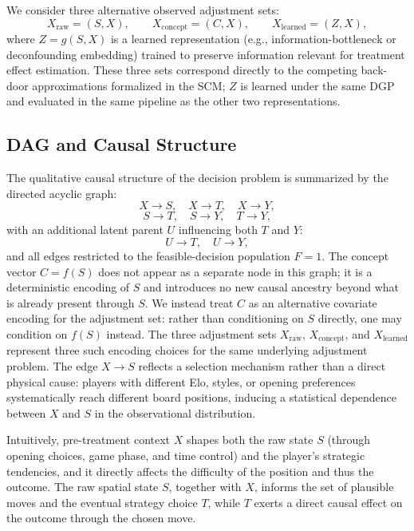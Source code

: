 \documentclass[11pt]{article}
\begin{document}
We consider three alternative observed adjustment sets:
\[
X_{\text{raw}} = (S, X), \qquad
X_{\text{concept}} = (C, X), \qquad
X_{\text{learned}} = (Z, X),
\]
where \(Z = g(S, X)\) is a learned representation (e.g., information-bottleneck or
deconfounding embedding) trained to preserve information relevant for treatment
effect estimation.\cite{kuang2020information,deconfoundingScores} These three sets
correspond directly to the competing back-door approximations formalized in the SCM;
$Z$ is learned under the same DGP and evaluated in the same pipeline as the other
two representations.

\subsection*{DAG and Causal Structure}

The qualitative causal structure of the decision problem is summarized by the
directed acyclic graph:
\[
X \rightarrow S, \quad X \rightarrow T, \quad X \rightarrow Y,
\]
\[
S \rightarrow T, \quad S \rightarrow Y, \quad T \rightarrow Y,
\]
with an additional latent parent \(U\) influencing both \(T\) and \(Y\):
\[
U \rightarrow T, \quad U \rightarrow Y,
\]
and all edges restricted to the feasible-decision population \(F=1\). The concept
vector \(C = f(S)\) does not appear as a separate node in this graph; it is a
deterministic encoding of \(S\) and introduces no new causal ancestry beyond what
is already present through \(S\). We instead treat \(C\) as an alternative covariate
encoding for the adjustment set: rather than conditioning on \(S\) directly, one may
condition on \(f(S)\) instead. The three adjustment sets $X_{\text{raw}}$,
$X_{\text{concept}}$, and $X_{\text{learned}}$ represent three such encoding choices
for the same underlying adjustment problem. The edge \(X \rightarrow S\) reflects a
selection mechanism rather than a direct physical cause: players with different Elo,
styles, or opening preferences systematically reach different board positions,
inducing a statistical dependence between \(X\) and \(S\) in the observational
distribution.

Intuitively, pre-treatment context \(X\) shapes both the raw state \(S\) (through
opening choices, game phase, and time control) and the player's strategic tendencies,
and it directly affects the difficulty of the position and thus the outcome. The raw
spatial state \(S\), together with \(X\), informs the set of plausible moves and the
eventual strategy choice \(T\), while \(T\) exerts a direct causal effect on the
outcome through the chosen move.
\end{document}
